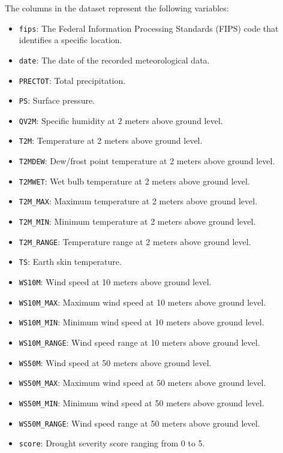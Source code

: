\documentclass{article}
\begin{document}
The columns in the dataset represent the following variables:
\begin{itemize}
    \item \texttt{fips}: The Federal Information Processing Standards (FIPS) code that identifies a specific location.
    \item \texttt{date}: The date of the recorded meteorological data.
    \item \texttt{PRECTOT}: Total precipitation.
    \item \texttt{PS}: Surface pressure.
    \item \texttt{QV2M}: Specific humidity at 2 meters above ground level.
    \item \texttt{T2M}: Temperature at 2 meters above ground level.
    \item \texttt{T2MDEW}: Dew/frost point temperature at 2 meters above ground level.
    \item \texttt{T2MWET}: Wet bulb temperature at 2 meters above ground level.
    \item \texttt{T2M\_MAX}: Maximum temperature at 2 meters above ground level.
    \item \texttt{T2M\_MIN}: Minimum temperature at 2 meters above ground level.
    \item \texttt{T2M\_RANGE}: Temperature range at 2 meters above ground level.
    \item \texttt{TS}: Earth skin temperature.
    \item \texttt{WS10M}: Wind speed at 10 meters above ground level.
    \item \texttt{WS10M\_MAX}: Maximum wind speed at 10 meters above ground level.
    \item \texttt{WS10M\_MIN}: Minimum wind speed at 10 meters above ground level.
    \item \texttt{WS10M\_RANGE}: Wind speed range at 10 meters above ground level.
    \item \texttt{WS50M}: Wind speed at 50 meters above ground level.
    \item \texttt{WS50M\_MAX}: Maximum wind speed at 50 meters above ground level.
    \item \texttt{WS50M\_MIN}: Minimum wind speed at 50 meters above ground level.
    \item \texttt{WS50M\_RANGE}: Wind speed range at 50 meters above ground level.
    \item \texttt{score}: Drought severity score ranging from 0 to 5.
\end{itemize}
\end{document}
